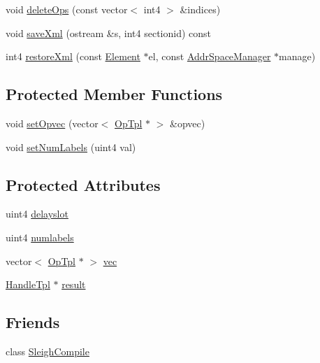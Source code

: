 \begin{DoxyCompactItemize}
\item 
void \mbox{\hyperlink{class_construct_tpl_aa14ea1a30814a8f8a2ae074b46562734}{delete\+Ops}} (const vector$<$ int4 $>$ \&indices)
\item 
void \mbox{\hyperlink{class_construct_tpl_af26ca1f89d087ed17c153b0fefdb8a14}{save\+Xml}} (ostream \&s, int4 sectionid) const
\item 
int4 \mbox{\hyperlink{class_construct_tpl_a0e22f6df1e5fb8ab5fe763b3f68dd1fa}{restore\+Xml}} (const \mbox{\hyperlink{class_element}{Element}} $\ast$el, const \mbox{\hyperlink{class_addr_space_manager}{Addr\+Space\+Manager}} $\ast$manage)
\end{DoxyCompactItemize}
\subsection*{Protected Member Functions}
\begin{DoxyCompactItemize}
\item 
void \mbox{\hyperlink{class_construct_tpl_afc7e7717c6b970b32c0306c94ecdfeec}{set\+Opvec}} (vector$<$ \mbox{\hyperlink{class_op_tpl}{Op\+Tpl}} $\ast$ $>$ \&opvec)
\item 
void \mbox{\hyperlink{class_construct_tpl_a23f7a20bd1a914bcc439a79767c2bd6f}{set\+Num\+Labels}} (uint4 val)
\end{DoxyCompactItemize}
\subsection*{Protected Attributes}
\begin{DoxyCompactItemize}
\item 
uint4 \mbox{\hyperlink{class_construct_tpl_a5db8bfa128cfbf7955169d18cf9510cd}{delayslot}}
\item 
uint4 \mbox{\hyperlink{class_construct_tpl_a493c686762fdacfa88a7508a9cd87896}{numlabels}}
\item 
vector$<$ \mbox{\hyperlink{class_op_tpl}{Op\+Tpl}} $\ast$ $>$ \mbox{\hyperlink{class_construct_tpl_a253e9fe8590d5675395612f7afb3f5f1}{vec}}
\item 
\mbox{\hyperlink{class_handle_tpl}{Handle\+Tpl}} $\ast$ \mbox{\hyperlink{class_construct_tpl_a81f6345fc9882da42d0960f11634c2d9}{result}}
\end{DoxyCompactItemize}
\subsection*{Friends}
\begin{DoxyCompactItemize}
\item 
class \mbox{\hyperlink{class_construct_tpl_a327c0b989084ddb923468b1440a055de}{Sleigh\+Compile}}
\end{DoxyCompactItemize}


